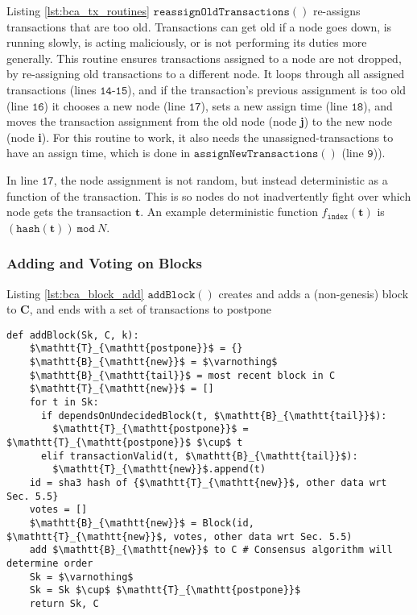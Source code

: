 Listing \ref{lst:bca_tx_routines} $\mathtt{reassignOldTransactions()}$ re-assigns transactions that are too old.
Transactions can get old if a node goes down, is running slowly, is acting maliciously, or is not performing its duties more generally.
This routine ensures transactions assigned to a node are not dropped, by re-assigning old transactions to a different node.
It loops through all assigned transactions (lines $\mathtt{14}$-$\mathtt{15}$), and if the transaction’s previous assignment is too old (line $\mathtt{16}$) it chooses a new node (line $\mathtt{17}$), sets a new assign time (line $\mathtt{18}$), and moves the transaction assignment from the old node (node \textbf{j}) to the new node (node \textbf{i}).
For this routine to work, it also needs the unassigned-transactions to have an assign time, which is done in $\mathtt{assignNewTransactions()}$ (line $\mathtt{9}$)).

In line $\mathtt{17}$, the node assignment is not random, but instead deterministic as a function of the transaction.
This is so nodes do not inadvertently fight over which node gets the transaction $\mathbf{t}$.
An example deterministic function $f_{\mathtt{index}}(\mathbf{t})$ is $(\mathtt{hash}(\mathbf{t}))\ \mathtt{mod}\ N$.

\subsubsection{Adding and Voting on Blocks}

\medskip
Listing \ref{lst:bca_block_add} $\mathtt{addBlock()}$ creates and adds a (non-genesis) block to $\mathbf{C}$, and ends with a set of transactions to postpone

\begin{minipage}{\linewidth}
  \begin{lstlisting}[caption={Routine for adding normal blocks.}, label={lst:bca_block_add}, style=python, mathescape=true]
  def addBlock(Sk, C, k):
    $\mathtt{T}_{\mathtt{postpone}}$ = {}
    $\mathtt{B}_{\mathtt{new}}$ = $\varnothing$
    $\mathtt{B}_{\mathtt{tail}}$ = most recent block in C
    $\mathtt{T}_{\mathtt{new}}$ = []
    for t in Sk:
      if dependsOnUndecidedBlock(t, $\mathtt{B}_{\mathtt{tail}}$):
        $\mathtt{T}_{\mathtt{postpone}}$ = $\mathtt{T}_{\mathtt{postpone}}$ $\cup$ t
      elif transactionValid(t, $\mathtt{B}_{\mathtt{tail}}$):
        $\mathtt{T}_{\mathtt{new}}$.append(t)
    id = sha3 hash of {$\mathtt{T}_{\mathtt{new}}$, other data wrt Sec. 5.5}
    votes = []
    $\mathtt{B}_{\mathtt{new}}$ = Block(id, $\mathtt{T}_{\mathtt{new}}$, votes, other data wrt Sec. 5.5)
    add $\mathtt{B}_{\mathtt{new}}$ to C # Consensus algorithm will determine order
    Sk = $\varnothing$
    Sk = Sk $\cup$ $\mathtt{T}_{\mathtt{postpone}}$
    return Sk, C
  \end{lstlisting}
\end{minipage}

